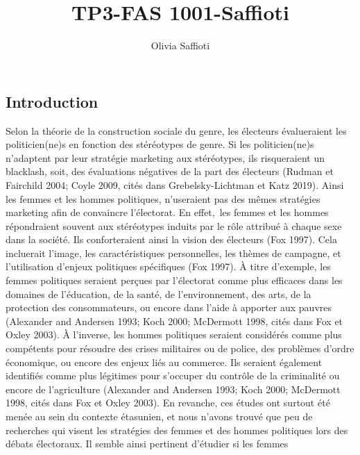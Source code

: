 \documentclass[
  letterpaper,
  DIV=11,
  numbers=noendperiod]{scrartcl}
\title{TP3-FAS 1001-Saffioti}
\author{Olivia Saffioti}
\date{}
\begin{document}
\maketitle
\ifdefined\Shaded\renewenvironment{Shaded}{\begin{tcolorbox}[interior hidden, breakable, frame hidden, borderline west={3pt}{0pt}{shadecolor}, sharp corners, enhanced, boxrule=0pt]}{\end{tcolorbox}}\fi

\hypertarget{introduction}{%
\subsection{Introduction}\label{introduction}}

Selon la théorie de la construction sociale du genre, les électeurs
évalueraient les politicien(ne)s en fonction des stéréotypes de genre.
Si les politicien(ne)s n'adaptent par leur stratégie marketing aux
stéréotypes, ils risqueraient un blacklash, soit, des évaluations
négatives de la part des électeurs (Rudman et Fairchild 2004; Coyle
2009, cités dans Grebelsky-Lichtman et Katz 2019). Ainsi les femmes et
les hommes politiques, n'useraient pas des mêmes stratégies marketing
afin de convaincre l'électorat. En effet,~les femmes et les hommes
répondraient souvent aux stéréotypes induits par le rôle attribué à
chaque sexe dans la société. Ils conforteraient ainsi la vision des
électeurs (Fox 1997). Cela incluerait l'image, les caractéristiques
personnelles, les thèmes de campagne, et l'utilisation d'enjeux
politiques spécifiques (Fox 1997). À titre d'exemple, les femmes
politiques seraient perçues par l'électorat comme plus efficaces dans
les domaines de l'éducation, de la santé, de l'environnement, des arts,
de la protection des consommateurs, ou encore dans l'aide à apporter aux
pauvres (Alexander and Andersen 1993; Koch 2000; McDermott 1998, cités
dans Fox et Oxley 2003). À l'inverse, les hommes politiques seraient
considérés comme plus compétents pour résoudre des crises militaires ou
de police, des problèmes d'ordre économique, ou encore des enjeux liés
au commerce. Ils seraient également identifiés comme plus légitimes pour
s'occuper du contrôle de la criminalité ou encore de l'agriculture
(Alexander and Andersen 1993; Koch 2000; McDermott 1998, cités dans Fox
et Oxley 2003). En revanche, ces études ont surtout été menée au sein du
contexte étasunien, et nous n'avons trouvé que peu de recherches qui
visent les stratégies des femmes et des hommes politiques lors des
débats électoraux. Il semble ainsi pertinent d'étudier si les femmes
\end{document}
